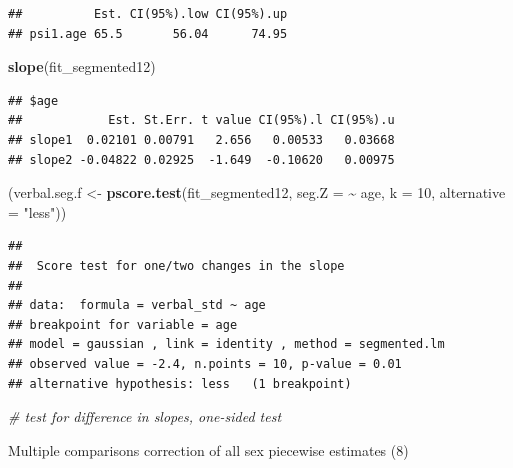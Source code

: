 \documentclass[
]{article}
\newenvironment{Shaded}{\begin{snugshade}}{\end{snugshade}}
\newcommand{\AttributeTok}[1]{\textcolor[rgb]{0.13,0.29,0.53}{#1}}
\newcommand{\CommentTok}[1]{\textcolor[rgb]{0.56,0.35,0.01}{\textit{#1}}}
\newcommand{\DecValTok}[1]{\textcolor[rgb]{0.00,0.00,0.81}{#1}}
\newcommand{\FunctionTok}[1]{\textcolor[rgb]{0.13,0.29,0.53}{\textbf{#1}}}
\newcommand{\NormalTok}[1]{#1}
\newcommand{\OtherTok}[1]{\textcolor[rgb]{0.56,0.35,0.01}{#1}}
\newcommand{\SpecialCharTok}[1]{\textcolor[rgb]{0.81,0.36,0.00}{\textbf{#1}}}
\newcommand{\StringTok}[1]{\textcolor[rgb]{0.31,0.60,0.02}{#1}}
\begin{document}
\begin{verbatim}
##          Est. CI(95%).low CI(95%).up
## psi1.age 65.5       56.04      74.95
\end{verbatim}

\begin{Shaded}
\begin{Highlighting}[]
\FunctionTok{slope}\NormalTok{(fit\_segmented12)}
\end{Highlighting}
\end{Shaded}

\begin{verbatim}
## $age
##            Est. St.Err. t value CI(95%).l CI(95%).u
## slope1  0.02101 0.00791   2.656   0.00533   0.03668
## slope2 -0.04822 0.02925  -1.649  -0.10620   0.00975
\end{verbatim}

\begin{Shaded}
\begin{Highlighting}[]
\NormalTok{(verbal.seg.f }\OtherTok{\textless{}{-}} \FunctionTok{pscore.test}\NormalTok{(fit\_segmented12, }\AttributeTok{seg.Z =} \SpecialCharTok{\textasciitilde{}}\NormalTok{ age, }\AttributeTok{k =} \DecValTok{10}\NormalTok{, }\AttributeTok{alternative =} \StringTok{"less"}\NormalTok{))}
\end{Highlighting}
\end{Shaded}

\begin{verbatim}
## 
##  Score test for one/two changes in the slope
## 
## data:  formula = verbal_std ~ age 
## breakpoint for variable = age 
## model = gaussian , link = identity , method = segmented.lm
## observed value = -2.4, n.points = 10, p-value = 0.01
## alternative hypothesis: less   (1 breakpoint)
\end{verbatim}

\begin{Shaded}
\begin{Highlighting}[]
\CommentTok{\# test for difference in slopes, one{-}sided test}
\end{Highlighting}
\end{Shaded}

Multiple comparisons correction of all sex piecewise estimates (8)
\end{document}
